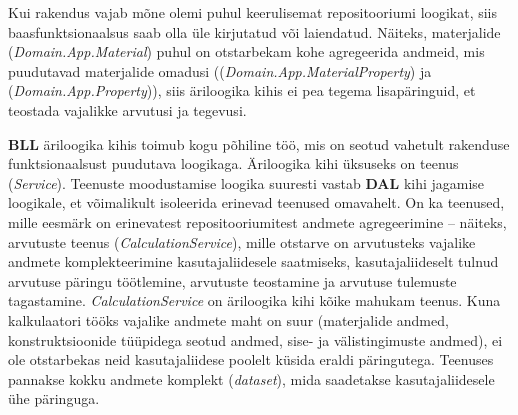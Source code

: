 Kui rakendus vajab mõne olemi puhul keerulisemat repositooriumi loogikat, siis baasfunktsionaalsus saab olla üle kirjutatud
või laiendatud. Näiteks, materjalide (\textit{Domain.App.Material}) puhul on otstarbekam kohe agregeerida andmeid, 
mis puudutavad materjalide omadusi ((\textit{Domain.App.MaterialProperty}) ja (\textit{Domain.App.Property})), siis
äriloogika kihis ei pea tegema lisapäringuid, et teostada vajalikke arvutusi ja tegevusi.


\textbf{BLL} äriloogika kihis toimub kogu põhiline töö, mis on seotud vahetult rakenduse funktsionaalsust puudutava loogikaga.
Äriloogika kihi üksuseks on teenus (\textit{Service}). Teenuste moodustamise loogika suuresti vastab \textbf{DAL} kihi jagamise loogikale,
et võimalikult isoleerida erinevad teenused omavahelt. On ka teenused, mille eesmärk on erinevatest repositooriumitest andmete agregeerimine --
näiteks, arvutuste teenus (\textit{CalculationService}), mille otstarve on arvutusteks vajalike andmete komplekteerimine kasutajaliidesele
saatmiseks, kasutajaliideselt tulnud arvutuse päringu töötlemine, arvutuste teostamine ja arvutuse tulemuste tagastamine.
\textit{CalculationService} on äriloogika kihi kõike mahukam teenus. Kuna kalkulaatori tööks vajalike andmete maht on suur (materjalide
andmed, konstruktsioonide tüüpidega seotud andmed, sise- ja välistingimuste andmed), ei ole otstarbekas
neid kasutajaliidese poolelt küsida eraldi päringutega. Teenuses pannakse kokku andmete komplekt (\textit{dataset}), mida saadetakse
kasutajaliidesele ühe päringuga.





